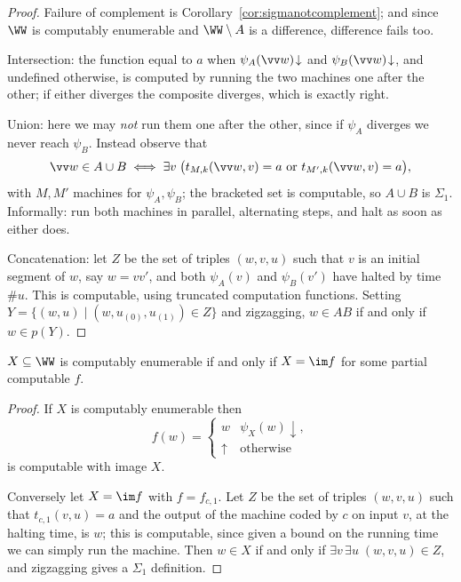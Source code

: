 \begin{proof}
	Failure of complement is Corollary~\ref{cor:sigmanotcomplement}; and since $\WW$ is computably enumerable and $\WW\setminus A$ is a difference, difference fails too.

	Intersection: the function equal to $a$ when $\psi_A(\vv w)\!\downarrow$ and $\psi_B(\vv w)\!\downarrow$, and undefined otherwise, is computed by running the two machines one after the other; if either diverges the composite diverges, which is exactly right.

	Union: here we may \emph{not} run them one after the other, since if $\psi_A$ diverges we never reach $\psi_B$. Instead observe that
	$$\vv w \in A \cup B \iff \exists v\;\big(t_{M,k}(\vv w, v) = a \text{ or } t_{M',k}(\vv w, v) = a\big),$$
	with $M, M'$ machines for $\psi_A, \psi_B$; the bracketed set is computable, so $A\cup B$ is $\Sigma_1$. Informally: run both machines in parallel, alternating steps, and halt as soon as either does.

	Concatenation: let $Z$ be the set of triples $(w,v,u)$ such that $v$ is an initial segment of $w$, say $w = vv'$, and both $\psi_A(v)$ and $\psi_B(v')$ have halted by time $\#u$. This is computable, using truncated computation functions. Setting $Y = \{(w,u) \mid (w, u_{(0)}, u_{(1)}) \in Z\}$ and zigzagging, $w \in AB$ if and only if $w \in p(Y)$.
\end{proof}

\begin{proposition}\label{prop:ceimage}
	$X \subseteq \WW$ is computably enumerable if and only if $X = \im f$ for some partial computable $f$.
\end{proposition}

\begin{proof}
	If $X$ is computably enumerable then
	$$f(w) = \begin{cases} w & \psi_X(w)\!\downarrow, \\ \uparrow & \text{otherwise}\end{cases}$$
	is computable with image $X$.

	Conversely let $X = \im f$ with $f = f_{c,1}$. Let $Z$ be the set of triples $(w,v,u)$ such that $t_{c,1}(v,u) = a$ and the output of the machine coded by $c$ on input $v$, at the halting time, is $w$; this is computable, since given a bound on the running time we can simply run the machine. Then $w \in X$ if and only if $\exists v\,\exists u\; (w,v,u) \in Z$, and zigzagging gives a $\Sigma_1$ definition.
\end{proof}

